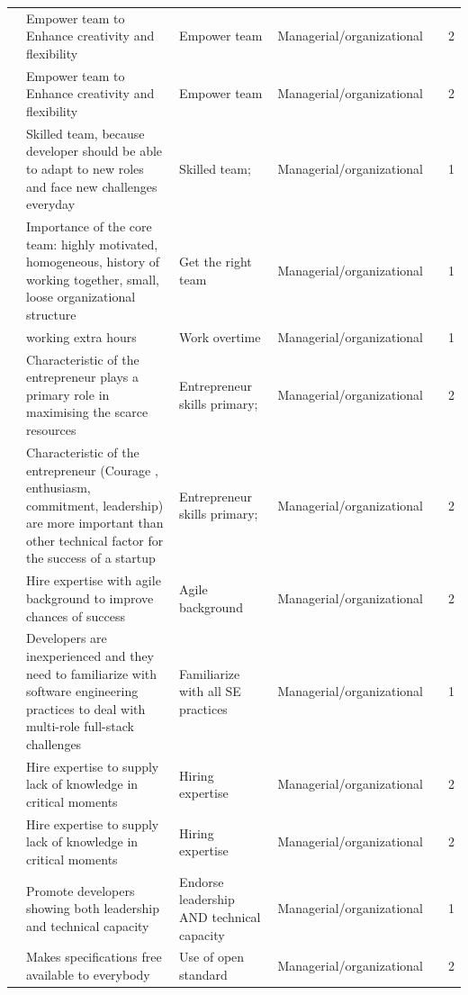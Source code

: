 \documentclass[final,5p,times,twocolumn]{elsarticle}
\begin{document}
\begin{center}
\begin{longtable}{|p{0.36in}|p{2.6in}|p{1.2in}|p{0.9in}|p{0.9in}|p{0.2in}|}
\cite{Coleman2008} & Empower  team to Enhance creativity and flexibility & Empower team & Managerial/organizational &       & 2 \\
\cite{Coleman2008a} & Empower  team to Enhance creativity and flexibility & Empower team & Managerial/organizational &       & 2 \\
\cite{Sutton2000} & Skilled team, because developer should be able to adapt to new roles and face new challenges everyday & Skilled team; & Managerial/organizational &       & 1 \\
\cite{Camel1994a} & Importance of the core team: highly motivated, homogeneous, history of working together, small, loose organizational structure & Get the right team & Managerial/organizational &       & 1 \\
\cite{Camel1994a} & working extra hours & Work overtime & Managerial/organizational &       & 1 \\
\cite{Chorev2006} & Characteristic of the entrepreneur plays a primary role in maximising the scarce resources & Entrepreneur skills primary; & Managerial/organizational &       & 2 \\
\cite{Kakati2003} & Characteristic of the entrepreneur (Courage , enthusiasm, commitment, leadership) are more important than other technical factor for the success of a startup  & Entrepreneur skills primary; & Managerial/organizational &       & 2 \\
\cite{Coleman2008} & Hire expertise with agile background to improve chances of success & Agile background  & Managerial/organizational &       & 2 \\
\cite{Crowne2002} & Developers are inexperienced and they need to familiarize with software engineering practices to deal with multi-role full-stack challenges & Familiarize with all SE practices & Managerial/organizational &       & 1 \\
\cite{Coleman2007} & Hire expertise to supply lack of knowledge in critical moments & Hiring expertise & Managerial/organizational &       & 2 \\
\cite{Coleman2008a} & Hire expertise to supply lack of knowledge in critical moments & Hiring expertise & Managerial/organizational &       & 2 \\
\cite{Crowne2002} & Promote developers showing both leadership and technical capacity & Endorse leadership AND technical capacity & Managerial/organizational &       & 1 \\
\cite{Yoffie1999} & Makes specifications free available to everybody & Use of open standard & Managerial/organizational &       & 2 \\

\end{longtable}
\end{center}
\end{document}
